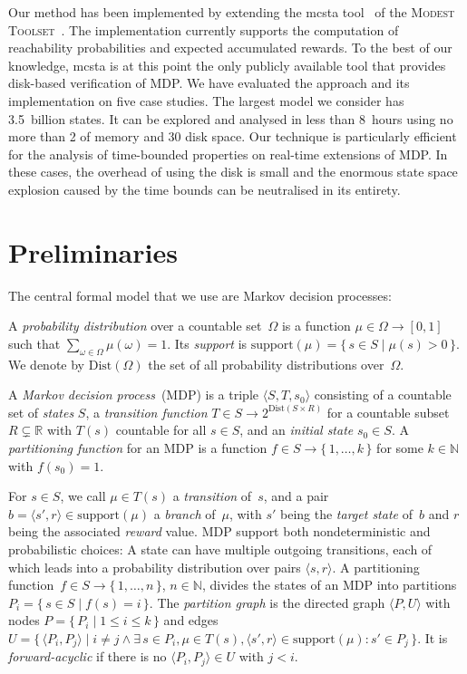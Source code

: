 \documentclass{llncs}
\newcommand{\mcsta}{\textsf{\mbox{mcsta}}\xspace}
\newcommand{\toolset}{\textsc{\mbox{Modest} Toolset}\xspace}
\newcommand{\sunit}[1]{\text{\begin{scriptsize}\,#1\end{scriptsize}}}
\newcommand{\Dist}[1]{\ensuremath{\mathrm{Dist}({#1})}\xspace}
\newcommand{\support}[1]{\ensuremath{\mathrm{support}({#1})}\xspace}
\newcommand{\set}[1]{\ensuremath{\{\,#1\,\}}}
\newcommand{\tuple}[1]{\ensuremath{\langle #1 \rangle}}
\newcommand{\powerset}[1]{\ensuremath{2^{#1}}\xspace}
\newcommand{\RR}{\ensuremath{\mathbb{R}}\xspace}
\newcommand{\NN}{\ensuremath{\mathbb{N}}\xspace}
\begin{document}
Our method has been implemented by extending the \mcsta tool~\cite{HHH14} of the \toolset~\cite{HH14}.
The implementation currently supports the computation of reachability probabilities and expected accumulated rewards.
To the best of our knowledge, \mcsta is at this point the only publicly available tool that provides disk-based verification of MDP.
We have evaluated the approach and its implementation on five case studies.
The largest model we consider has 3.5~billion states.
It can be explored and analysed in less than 8~hours using no more than 2\sunit{GB} of memory and 30\sunit{GB} disk space.
Our technique is particularly efficient for the analysis of time-bounded properties on real-time extensions of MDP.
In these cases, the overhead of using the disk is small and the enormous state space explosion caused by the time bounds can be neutralised in its entirety.




\section{Preliminaries}
\label{sec:Preliminaries}

The central formal model that we use are Markov decision processes:

\begin{definition}
A \emph{probability distribution} over a countable set~$\varOmega$ is a function $\mu \in \varOmega \to [0, 1]$ such that $\sum_{\omega \in \varOmega}{\mu(\omega)} = 1$.
Its \emph{support} is $\support{\mu} = \set{s \in S \mid \mu(s) > 0}$.
We denote by $\Dist{\varOmega}$ the set of all probability distributions over~$\varOmega$.
\end{definition}

\begin{definition}
A \emph{Markov decision process}~(MDP) is a triple $\tuple{S, T, s_0}$ consisting of a countable set of \emph{states} $S$, a \emph{transition function} $T \in S \to \powerset{\Dist{S \times R}}$ for a countable subset $R \subsetneq \RR$ with $T(s)$ countable for all $s \in S$, and an \emph{initial state} $s_0 \in S$.
A \emph{partitioning function} for an MDP is a function $f \in S \to \set{ 1, \dots, k }$ for some $k \in \NN$ with $f(s_0) = 1$.
\end{definition}
For $s \in S$, we call $\mu \in T(s)$ a \emph{transition} of~$s$, and a pair $b = \tuple{s', r} \in \support{\mu}$ a \emph{branch} of~$\mu$, with $s'$ being the \emph{target state} of~$b$ and $r$ being the associated \emph{reward} value.
MDP support both nondeterministic and probabilistic choices:
A state can have multiple outgoing transitions, each of which leads into a probability distribution over pairs $\tuple{s, r}$.
A partitioning function~$f \in S \to \set{1, \dots, n}$, $n \in \NN$, divides the states of an MDP into partitions $P_i = \set{ s \in S \mid f(s) = i }$.
The \emph{partition graph} is the directed graph $\tuple{P, U}$ with nodes $P = \set{ P_i \mid 1 \leq i \leq k }$ and edges $U = \set{ \tuple{P_i, P_j} \mid i \neq j \wedge \exists\,s \in P_i, \mu \in T(s), \tuple{s', r} \in \support{\mu}\colon s' \in P_j }$.
It is \emph{forward-acyclic} if there is no $\tuple{P_i, P_j} \in U$ with $j < i$.
\end{document}
